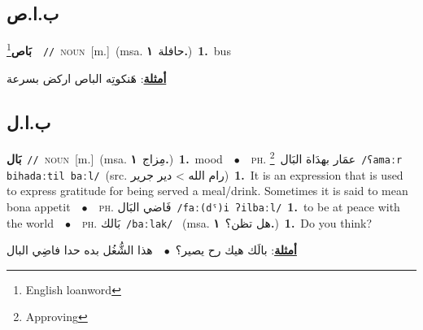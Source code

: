 \documentclass[10pt,a4paper,twoside]{article} %
\begin{document}
\begin{multicols}{2}
\vspace{-3mm}
\subsection*{\color{blue}\foreignlanguage{arabic}{ب.ا.ص}\color{blue}{ (ntws)}} 

{\setlength\topsep{0pt}\textbf{\foreignlanguage{arabic}{بَاص}}\footnote{English loanword}\ \ {\color{gray}\texttt{//}\color{black}}\ \textsc{noun}\ [m.]\ \color{gray}(msa. \foreignlanguage{arabic}{حافلة}~\foreignlanguage{arabic}{\textbf{١.}})\color{black}\ \textbf{1.}~bus\  \begin{flushright}\color{gray}\foreignlanguage{arabic}{\textbf{\underline{\foreignlanguage{arabic}{أمثلة}}}: هَنكوتِه الباص اركض بسرعة}\end{flushright}\color{black}} \vspace{2mm}

\vspace{-3mm}
\subsection*{\color{blue}\foreignlanguage{arabic}{ب.ا.ل}\color{blue}{ (ntws)}} 

{\setlength\topsep{0pt}\textbf{\foreignlanguage{arabic}{بَال}}\ {\color{gray}\texttt{//}\color{black}}\ \textsc{noun}\ [m.]\ \color{gray}(msa. \foreignlanguage{arabic}{مِزاج}~\foreignlanguage{arabic}{\textbf{١.}})\color{black}\ \textbf{1.}~mood\ \ $\bullet$\ \ \textsc{ph.} \color{gray} \foreignlanguage{arabic}{عمَار بهدَاة البَال}\color{black}\ \footnote{Approving}\ {\color{gray}\texttt{/{\sffamily ʕamaːr bihadaːtil baːl}/}\color{black}}\ \color{gray}(src. \foreignlanguage{arabic}{رام الله > دير جرير})\color{black}\ \textbf{1.}~It is an expression that is used to express gratitude for being served a meal/drink. Sometimes it is said to mean bona appetit\ \ $\bullet$\ \ \textsc{ph.} \color{gray} \foreignlanguage{arabic}{فَاضي البَال}\color{black}\ {\color{gray}\texttt{/{\sffamily faː(dˤ)i ʔilbaːl}/}\color{black}}\ \textbf{1.}~to be at peace with the world\ \ $\bullet$\ \ \textsc{ph.} \color{gray} \foreignlanguage{arabic}{بَالك}\color{black}\ {\color{gray}\texttt{/{\sffamily baːlak}/}\color{black}}\ \color{gray} (msa. \foreignlanguage{arabic}{هل تظن؟}~\foreignlanguage{arabic}{\textbf{١.}})\color{black}\ \textbf{1.}~Do you think?\  \begin{flushright}\color{gray}\foreignlanguage{arabic}{\textbf{\underline{\foreignlanguage{arabic}{أمثلة}}}: بالَك هيك رح يصير؟\ $\bullet$\ \  هذا الشُّغُل بده حدا فاضِي البال}\end{flushright}\color{black}} \vspace{2mm}


\end{multicols}
\end{document}
